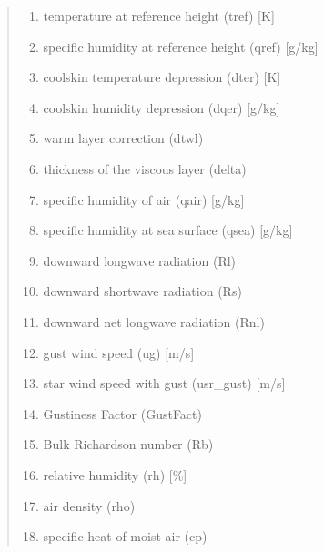 \documentclass[letterpaper,10pt,english]{sphinxmanual}
\begin{document}
\begin{fulllineitems}
\begin{quote}
\begin{description}
\begin{itemize}
\begin{description}
\begin{enumerate}
\item {} 
\sphinxAtStartPar
temperature at reference height (tref) {[}K{]}

\item {} 
\sphinxAtStartPar
specific humidity at reference height (qref) {[}g/kg{]}

\item {} 
\sphinxAtStartPar
cool\sphinxhyphen{}skin temperature depression (dter) {[}K{]}

\item {} 
\sphinxAtStartPar
cool\sphinxhyphen{}skin humidity depression (dqer) {[}g/kg{]}

\item {} 
\sphinxAtStartPar
warm layer correction (dtwl)

\item {} 
\sphinxAtStartPar
thickness of the viscous layer (delta)

\item {} 
\sphinxAtStartPar
specific humidity of air (qair) {[}g/kg{]}

\item {} 
\sphinxAtStartPar
specific humidity at sea surface (qsea) {[}g/kg{]}

\item {} 
\sphinxAtStartPar
downward longwave radiation (Rl)

\item {} 
\sphinxAtStartPar
downward shortwave radiation (Rs)

\item {} 
\sphinxAtStartPar
downward net longwave radiation (Rnl)

\item {} 
\sphinxAtStartPar
gust wind speed (ug) {[}m/s{]}

\item {} 
\sphinxAtStartPar
star wind speed with gust (usr\_gust) {[}m/s{]}

\item {} 
\sphinxAtStartPar
Gustiness Factor (GustFact)

\item {} 
\sphinxAtStartPar
Bulk Richardson number (Rb)

\item {} 
\sphinxAtStartPar
relative humidity (rh) {[}\%{]}

\item {} 
\sphinxAtStartPar
air density (rho)

\item {} 
\sphinxAtStartPar
specific heat of moist air (cp)


\end{enumerate}
\end{description}
\end{itemize}
\end{description}
\end{quote}
\end{fulllineitems}
\end{document}
